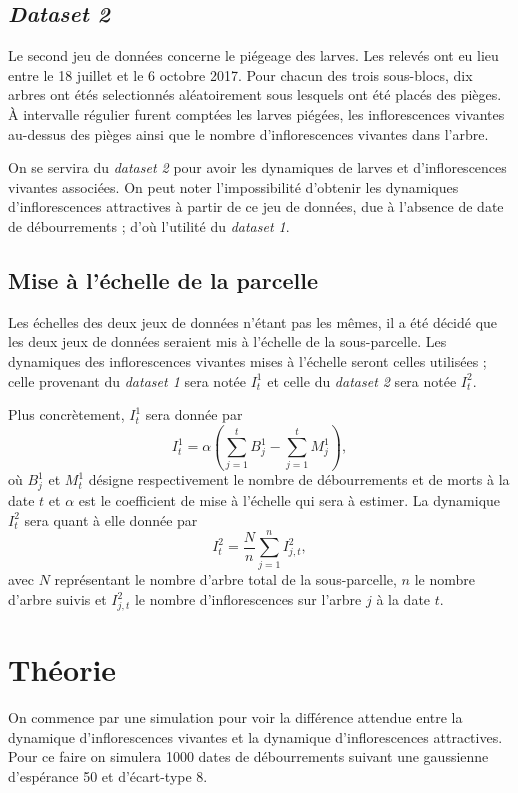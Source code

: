 \documentclass[a4paper, 11pt]{article}
\begin{document}
\subsection{\textit{Dataset 2}}

Le second jeu de données concerne le piégeage des larves. Les relevés ont eu lieu entre le 18 juillet et le 6 octobre 2017. Pour chacun des trois sous-blocs, dix arbres ont étés selectionnés aléatoirement sous lesquels ont été placés des pièges. À intervalle régulier furent comptées les larves piégées, les inflorescences vivantes au-dessus des pièges ainsi que le nombre d'inflorescences vivantes dans l'arbre.

On se servira du \textit{dataset 2} pour avoir les dynamiques de larves et d'inflorescences vivantes associées. On peut noter l'impossibilité d'obtenir les dynamiques d'inflorescences attractives à partir de ce jeu de données, due à l'absence de date de débourrements ; d'où l'utilité du \textit{dataset 1}.

\subsection{Mise à l'échelle de la parcelle}

Les échelles des deux jeux de données n'étant pas les mêmes, il a été décidé que les deux jeux de données seraient mis à l'échelle de la sous-parcelle. Les dynamiques des inflorescences vivantes mises à l'échelle seront celles utilisées ; celle provenant du \textit{dataset 1} sera notée $I_t^1$ et celle du \textit{dataset 2} sera notée $I_t^2$.

Plus concrètement, $I_t^1$ sera donnée par
$$I_t^1 = \alpha\left( \sum_{j=1}^t B_j^1 - \sum_{j=1}^t M_j^1 \right),$$
où $B_j^1$ et $M_t^1$ désigne respectivement le nombre de débourrements et de morts à la date $t$ et $\alpha$ est le coefficient de mise à l'échelle qui sera à estimer. La dynamique $I_t^2$ sera quant à elle donnée par
$$I_t^2 = \frac{N}{n}\sum_{j=1}^n I_{j, t}^2,$$
avec $N$ représentant le nombre d'arbre total de la sous-parcelle, $n$ le nombre d'arbre suivis et $I_{j, t}^2$ le nombre d'inflorescences sur l'arbre $j$ à la date $t$.

\section{Théorie}

On commence par une simulation pour voir la différence attendue entre la dynamique d'inflorescences vivantes et la dynamique d'inflorescences attractives. Pour ce faire on simulera 1000 dates de débourrements suivant une gaussienne d'espérance 50 et d'écart-type 8.
\end{document}
